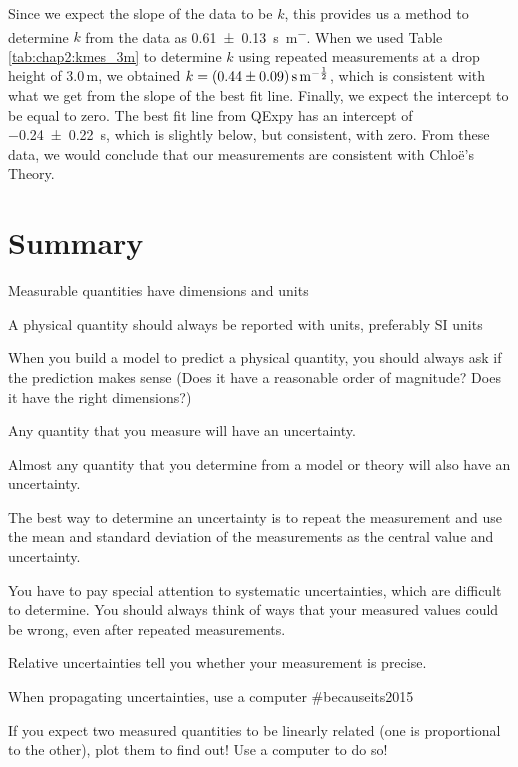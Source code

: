 Since we expect the slope of the data to be $k$, this provides us a method to determine $k$ from the data as \SI{0.61\pm 0.13}{s.m^{-}}. When we used Table \ref{tab:chap2:kmes_3m} to determine $k$ using repeated measurements at a drop height of 3.0\,m, we obtained $k=\SI{0.44\pm 0.09}{s.m^{-\frac{1}{2}}}$, which is consistent with what we get from the slope of the best fit line. Finally, we expect the intercept to be equal to zero. The best fit line from QExpy has an intercept of \SI{-0.24\pm 0.22}{s}, which is slightly below, but consistent, with zero. From these data, we would conclude that our measurements are consistent with Chlo\"e's Theory.

\newpage
\section{Summary}
\vspace{2cm}
\begin{chapterSummary}
\item Measurable quantities have dimensions and units
\item A physical quantity should always be reported with units, preferably SI units
\item When you build a model to predict a physical quantity, you should always ask if the prediction makes sense (Does it have a reasonable order of magnitude? Does it have the right dimensions?)
\item Any quantity that you measure will have an uncertainty.
\item Almost any quantity that you determine from a model or theory will also have an uncertainty.
\item The best way to determine an uncertainty is to repeat the measurement and use the mean and standard deviation of the measurements as the central value and uncertainty.
\item You have to pay special attention to systematic uncertainties, which are difficult to determine. You should always think of ways that your measured values could be wrong, even after repeated measurements.
\item Relative uncertainties tell you whether your measurement is precise.
\item When propagating uncertainties, use a computer \#becauseits2015
\item If you expect two measured quantities to be linearly related (one is proportional to the other), plot them to find out! Use a computer to do so!
\end{chapterSummary}